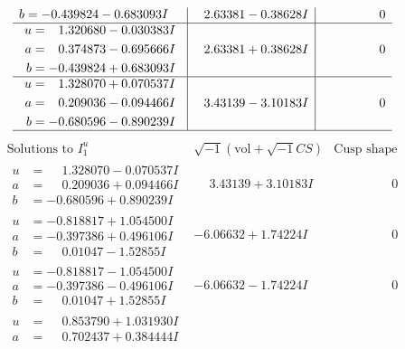\documentclass[1p]{elsarticle_modified}
\theoremstyle{definition}
\newcommand{\I}{\sqrt{-1}}
\begin{document}
$$\begin{array}{c|c|c}
\begin{aligned}
b &= -0.439824 - 0.683093 I\end{aligned}
 & \phantom{-}2.63381 - 0.38628 I & \phantom{-0.000000 } 0 \\ \hline\begin{aligned}
u &= \phantom{-}1.320680 - 0.030383 I \\
a &= \phantom{-}0.374873 - 0.695666 I \\
b &= -0.439824 + 0.683093 I\end{aligned}
 & \phantom{-}2.63381 + 0.38628 I & \phantom{-0.000000 } 0 \\ \hline\begin{aligned}
u &= \phantom{-}1.328070 + 0.070537 I \\
a &= \phantom{-}0.209036 - 0.094466 I \\
b &= -0.680596 - 0.890239 I\end{aligned}
 & \phantom{-}3.43139 - 3.10183 I & \phantom{-0.000000 } 0\\
 \hline 
 \end{array}$$\newpage$$\begin{array}{c|c|c}  
\text{Solutions to }I^u_{1}& \I (\text{vol} + \sqrt{-1}CS) & \text{Cusp shape}\\
 \hline 
\begin{aligned}
u &= \phantom{-}1.328070 - 0.070537 I \\
a &= \phantom{-}0.209036 + 0.094466 I \\
b &= -0.680596 + 0.890239 I\end{aligned}
 & \phantom{-}3.43139 + 3.10183 I & \phantom{-0.000000 } 0 \\ \hline\begin{aligned}
u &= -0.818817 + 1.054500 I \\
a &= -0.397386 + 0.496106 I \\
b &= \phantom{-}0.01047 - 1.52855 I\end{aligned}
 & -6.06632 + 1.74224 I & \phantom{-0.000000 } 0 \\ \hline\begin{aligned}
u &= -0.818817 - 1.054500 I \\
a &= -0.397386 - 0.496106 I \\
b &= \phantom{-}0.01047 + 1.52855 I\end{aligned}
 & -6.06632 - 1.74224 I & \phantom{-0.000000 } 0 \\ \hline\begin{aligned}
u &= \phantom{-}0.853790 + 1.031930 I \\
a &= \phantom{-}0.702437 + 0.384444 I \\

\end{aligned}
\end{array}$$
\end{document}
